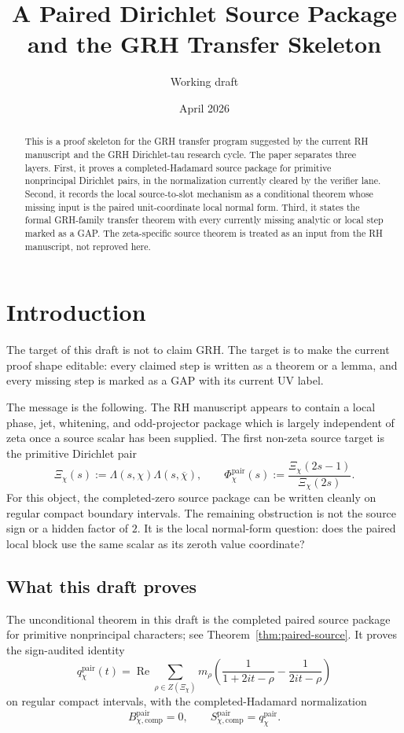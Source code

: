 \documentclass[11pt,a4paper]{amsart}
\title{A Paired Dirichlet Source Package and the GRH Transfer Skeleton}
\author{Working draft}
\date{April 2026}
\theoremstyle{plain}
\theoremstyle{definition}
\newcommand{\GRH}{\mathrm{GRH}}
\newcommand{\Real}{\operatorname{Re}}
\newcommand{\pair}{\mathrm{pair}}
\newcommand{\comp}{\mathrm{comp}}
\begin{document}
\begin{abstract}
This is a proof skeleton for the GRH transfer program suggested by the current
RH manuscript and the GRH Dirichlet-tau research cycle.  The paper separates
three layers.  First, it proves a completed-Hadamard source package for
primitive nonprincipal Dirichlet pairs, in the normalization currently cleared
by the verifier lane.  Second, it records the local source-to-slot mechanism
as a conditional theorem whose missing input is the paired unit-coordinate
local normal form.  Third, it states the formal GRH-family transfer theorem
with every currently missing analytic or local step marked as a GAP.  The
zeta-specific source theorem is treated as an input from the RH manuscript,
not reproved here.
\end{abstract}

\maketitle
\tableofcontents

\section{Introduction}

The target of this draft is not to claim \(\GRH\).  The target is to make the
current proof shape editable: every claimed step is written as a theorem or a
lemma, and every missing step is marked as a GAP with its current UV label.

The message is the following.  The RH manuscript appears to contain a local
phase, jet, whitening, and odd-projector package which is largely independent
of zeta once a source scalar has been supplied.  The first non-zeta source
target is the primitive Dirichlet pair
\[
  \Xi_\chi(s):=\Lambda(s,\chi)\Lambda(s,\overline\chi),
  \qquad
  \Phi_\chi^{\pair}(s):=\frac{\Xi_\chi(2s-1)}{\Xi_\chi(2s)}.
\]
For this object, the completed-zero source package can be written cleanly on
regular compact boundary intervals.  The remaining obstruction is not the
source sign or a hidden factor of \(2\).  It is the local normal-form question:
does the paired local block use the same scalar as its zeroth value
coordinate?

\subsection{What this draft proves}

The unconditional theorem in this draft is the completed paired source package
for primitive nonprincipal characters; see Theorem~\ref{thm:paired-source}.
It proves the sign-audited identity
\[
  q_\chi^{\pair}(t)
  =
  \Real\sum_{\rho\in Z(\Xi_\chi)}
  m_\rho
  \left(
    \frac{1}{1+2it-\rho}
    -
    \frac{1}{2it-\rho}
  \right)
\]
on regular compact intervals, with the completed-Hadamard normalization
\[
  B_{\chi,\comp}^{\pair}=0,
  \qquad
  S_{\chi,\comp}^{\pair}=q_\chi^{\pair}.
\]
\end{document}
